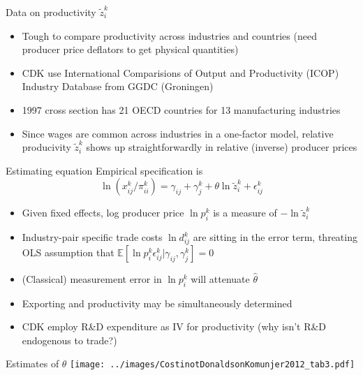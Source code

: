 \documentclass[10pt,notes=hide]{beamer}
\begin{document}
\begin{frame}{Data on productivity $\tilde{z}_i^k$}
\begin{itemize}
	\item Tough to compare productivity across industries and countries (need producer price deflators to get physical quantities)
	\item CDK use International Comparisions of Output and Productivity (ICOP) Industry Database from GGDC (Groningen)
	\item 1997 cross section has 21 OECD countries for 13 manufacturing industries
	\item Since wages are common across industries in a one-factor model,
	relative producivity $\tilde{z}_i^k$ shows up straightforwardly in relative (inverse) producer prices
\end{itemize}
\end{frame}
\begin{frame}{Estimating equation}
Empirical specification is
\begin{equation*}
\ln \left({x}_{ij}^{k}/\pi_{ii}^k \right) = \gamma_{ij} + \gamma_j^k + \theta \ln \tilde{z}_{i}^{k} + \epsilon_{ij}^k
\end{equation*}
\begin{itemize}
	\item Given fixed effects, log producer price $\ln p_i^k$ is a measure of $-\ln \tilde{z}_{i}^{k}$
	\item Industry-pair specific trade costs $\ln d_{ij}^k$ are sitting in the error term,
	threating OLS assumption that $\mathbb{E}\left[\ln p_i^k \epsilon_{ij}^k\vert \gamma_{ij},\gamma_j^k\right]=0$
	\item (Classical) measurement error in $\ln p_i^k$ will attenuate $\hat{\theta}$
	\item Exporting and productivity may be simultaneously determined
	\item CDK employ R\&D expenditure as IV for productivity (why isn't R\&D endogenous to trade?)
\end{itemize}
\end{frame}
\begin{frame}{Estimates of $\theta$}
\texttt{[image: ../images/CostinotDonaldsonKomunjer2012\_tab3.pdf]}
\end{frame}
\end{document}

